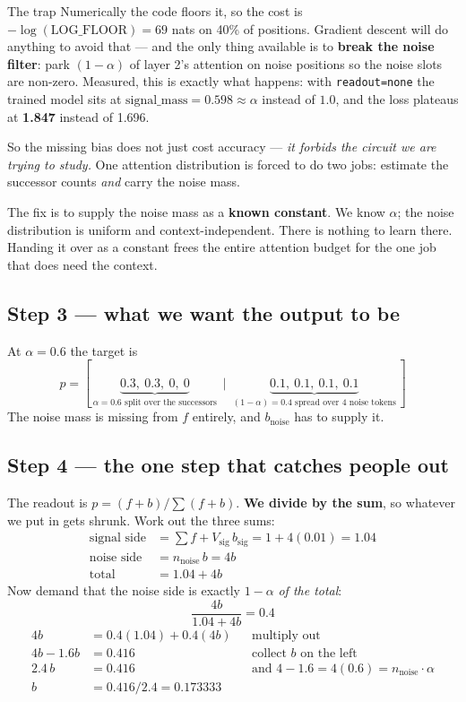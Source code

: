 \documentclass[11pt]{article}
\newcommand{\Vsig}{V_{\mathrm{sig}}}
\newcommand{\nnoise}{n_{\mathrm{noise}}}
\newcommand{\bsig}{b_{\mathrm{sig}}}
\newcommand{\bnoise}{b_{\mathrm{noise}}}
\begin{document}
\begin{warningbox}{The trap}
Numerically the code floors it, so the cost is $-\log(\text{LOG\_FLOOR})=69$ nats on 40\% of
positions. Gradient descent will do anything to avoid that --- and the only thing available is to
\textbf{break the noise filter}: park $(1-\alpha)$ of layer 2's attention on noise positions so the
noise slots are non-zero. Measured, this is exactly what happens: with \texttt{readout=none} the
trained model sits at $\text{signal\_mass}=0.598\approx\alpha$ instead of $1.0$, and the loss
plateaus at \textbf{1.847} instead of 1.696.

So the missing bias does not just cost accuracy --- \emph{it forbids the circuit we are trying to
study.} One attention distribution is forced to do two jobs: estimate the successor counts
\emph{and} carry the noise mass.
\end{warningbox}

The fix is to supply the noise mass as a \textbf{known constant}. We know $\alpha$; the noise
distribution is uniform and context-independent. There is nothing to learn there. Handing it over
as a constant frees the entire attention budget for the one job that does need the context.

\subsection{Step 3 --- what we want the output to be}

At $\alpha=0.6$ the target is
\[
p=[\,\underbrace{0.3,\ 0.3,\ 0,\ 0}_{\alpha=0.6 \text{ split over the successors}}\ \mid\
\underbrace{0.1,\ 0.1,\ 0.1,\ 0.1}_{(1-\alpha)=0.4 \text{ spread over 4 noise tokens}}\,]
\]
The noise mass is missing from $f$ entirely, and $\bnoise$ has to supply it.

\subsection{Step 4 --- the one step that catches people out}

The readout is $p=(f+b)/\!\sum(f+b)$. \textbf{We divide by the sum}, so whatever we put in gets
shrunk. Work out the three sums:
\[
\begin{aligned}
\text{signal side} &= \textstyle\sum f + \Vsig\,\bsig = 1+4(0.01)=1.04\\
\text{noise side}  &= \nnoise\, b = 4b\\
\text{total}       &= 1.04+4b
\end{aligned}
\]
Now demand that the noise side is exactly $1-\alpha$ \emph{of the total}:
\[
\frac{4b}{1.04+4b}=0.4
\]
\[
\begin{aligned}
4b &= 0.4(1.04)+0.4(4b) &&\text{multiply out}\\
4b-1.6b &= 0.416 &&\text{collect } b \text{ on the left}\\
2.4\,b &= 0.416 &&\text{and } 4-1.6=4(0.6)=\nnoise\cdot\alpha\\
b &= 0.416/2.4 = 0.173333
\end{aligned}
\]
\end{document}
